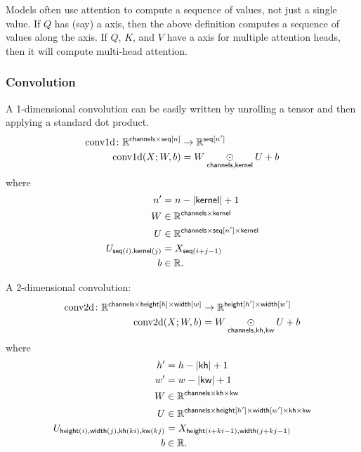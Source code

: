 \documentclass{article}
\newcommand{\reals}{\mathbb{R}}
\begin{document}
Models often use attention to compute a sequence of values, not just a single value. If $Q$ has (say) a  axis, then the above definition computes a sequence of values along the  axis. If $Q$, $K$, and $V$ have a  axis for multiple attention heads, then it will compute multi-head attention.

\subsubsection{Convolution}

A 1-dimensional convolution can be easily written by unrolling a tensor and then
applying a standard dot product.
\begin{align*}
\text{conv1d} \colon \reals^{\name{channels} \times \nset{seq}{n}} &\rightarrow \mathbb{R}^{\nset{seq}{n'}} \\
\text{conv1d}(X; W, b) &= W \ndot{channels, kernel} U + b
\end{align*}
where
\begin{align*}
n' &= n-|\name{kernel}|+1 \\
W &\in \reals^{\name{channels} \times \name{kernel}} \\
U &\in \reals^{\name{channels} \times \nset{seq}{n'} \times \name{kernel}} \\
U_{\nidx{seq}{i}, \nidx{kernel}{j}} & = X_{\nidx{seq}{i+j - 1}} \\
b &\in \reals.
\end{align*} 

A 2-dimensional convolution:
\begin{align*}
  \text{conv2d} \colon \reals^{\name{channels} \times \nset{height}{h} \times \nset{width}{w}} %
  &\rightarrow \reals^{\nset{height}{h'} \times \nset{width}{w'}} \\
  \text{conv2d}(X; W, b) &= W \ndot{channels, kh, kw} U + b
\end{align*}  
where
\begin{align*}
h' &= h-|\name{kh}|+1 \\
w' &= w-|\name{kw}|+1 \\
W &\in \reals^{\name{channels} \times \name{kh} \times \name{kw}} \\
U &\in \reals^{\name{channels} \times \nset{height}{h'} \times \nset{width}{w'} \times \name{kh} \times \name{kw}}  \\
U_{\nidx{height}{i}, \nidx{width}{j}, \nidx{kh}{ki}, \nidx{kw}{kj}} &= X_{\nidx{height}{i+ki-1}, \nidx{width}{j+kj-1}} \\
b &\in \reals.
\end{align*}
\end{document}
